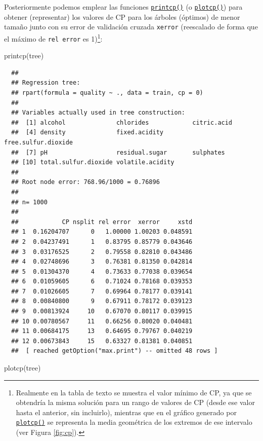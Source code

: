 \documentclass[
]{book}
\newenvironment{Shaded}{\begin{snugshade}}{\end{snugshade}}
\newcommand{\FunctionTok}[1]{\textcolor[rgb]{0.00,0.00,0.00}{#1}}
\newcommand{\NormalTok}[1]{#1}
\theoremstyle{break}
\theoremstyle{nonumberplain}
\begin{document}
Posteriormente podemos emplear las funciones \href{https://rdrr.io/pkg/rpart/man/printcp.html}{\texttt{printcp()}} (o \href{https://rdrr.io/pkg/rpart/man/plotcp.html}{\texttt{plotcp()}}) para obtener (representar)
los valores de CP para los árboles (óptimos) de menor tamaño junto con su error de validación cruzada
\texttt{xerror} (reescalado de forma que el máximo de \texttt{rel\ error} es 1)\footnote{Realmente en la tabla de texto se muestra el valor mínimo de CP, ya que se obtendría la misma solución para un rango de valores de CP (desde ese valor hasta el anterior, sin incluirlo), mientras que en el gráfico generado por \href{https://rdrr.io/pkg/rpart/man/plotcp.html}{\texttt{plotcp()}} se representa la media geométrica de los extremos de ese intervalo (ver Figura \ref{fig:cp}).}:

\begin{Shaded}
\begin{Highlighting}[]
\FunctionTok{printcp}\NormalTok{(tree)}
\end{Highlighting}
\end{Shaded}

\begin{verbatim}
  ## 
  ## Regression tree:
  ## rpart(formula = quality ~ ., data = train, cp = 0)
  ## 
  ## Variables actually used in tree construction:
  ##  [1] alcohol              chlorides            citric.acid         
  ##  [4] density              fixed.acidity        free.sulfur.dioxide 
  ##  [7] pH                   residual.sugar       sulphates           
  ## [10] total.sulfur.dioxide volatile.acidity    
  ## 
  ## Root node error: 768.96/1000 = 0.76896
  ## 
  ## n= 1000 
  ## 
  ##            CP nsplit rel error  xerror     xstd
  ## 1  0.16204707      0   1.00000 1.00203 0.048591
  ## 2  0.04237491      1   0.83795 0.85779 0.043646
  ## 3  0.03176525      2   0.79558 0.82810 0.043486
  ## 4  0.02748696      3   0.76381 0.81350 0.042814
  ## 5  0.01304370      4   0.73633 0.77038 0.039654
  ## 6  0.01059605      6   0.71024 0.78168 0.039353
  ## 7  0.01026605      7   0.69964 0.78177 0.039141
  ## 8  0.00840800      9   0.67911 0.78172 0.039123
  ## 9  0.00813924     10   0.67070 0.80117 0.039915
  ## 10 0.00780567     11   0.66256 0.80020 0.040481
  ## 11 0.00684175     13   0.64695 0.79767 0.040219
  ## 12 0.00673843     15   0.63327 0.81381 0.040851
  ##  [ reached getOption("max.print") -- omitted 48 rows ]
\end{verbatim}

\begin{Shaded}
\begin{Highlighting}[]
\FunctionTok{plotcp}\NormalTok{(tree)}
\end{Highlighting}
\end{Shaded}
\end{document}
